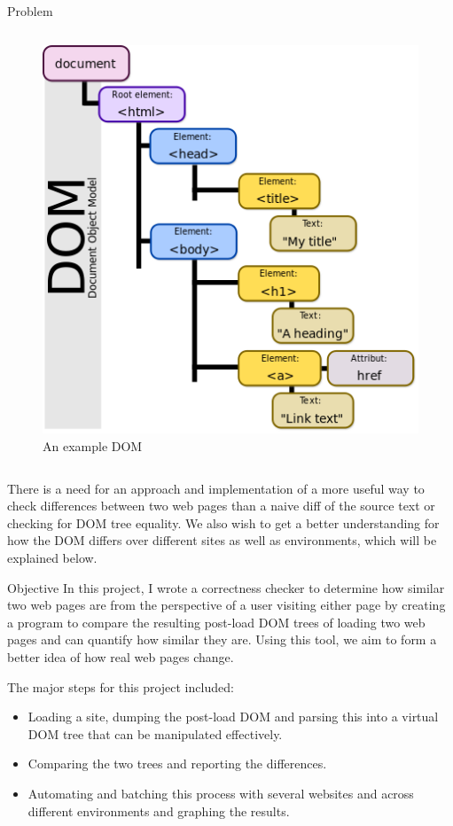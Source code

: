 \documentclass[final]{beamer}
\newlength{\halfcolwid}
\newlength{\onecolwid}
\begin{document}
\begin{frame}[t]
\begin{columns}[t]
\begin{column}{\onecolwid}
\begin{alertblock}{Problem}
\begin{columns}
\begin{column}{\halfcolwid} %
\begin{figure}
\includegraphics[width=0.6\linewidth]{dom.png}
\caption{An example DOM}
\end{figure}
\end{column}
\end{columns}
There is a need for an approach and implementation of a more useful way to check differences between two web pages than a naive diff of the source text or checking for DOM tree equality. We also wish to get a better understanding for how the DOM differs over different sites as well as environments, which will be explained below.
\end{alertblock}


\begin{block}{Objective}
In this project, I wrote a correctness checker to determine how similar two web pages are from the perspective of a user visiting either page by creating a program to compare the resulting post-load DOM trees of loading two web pages and can quantify how similar they are. Using this tool, we aim to form a better idea of how real web pages change. 

The major steps for this project included:
\begin{itemize}
    \item Loading a site, dumping the post-load DOM and parsing this into a virtual DOM tree that can be manipulated effectively. 
    \item Comparing the two trees and reporting the differences.
    \item Automating and batching this process with several websites and across different environments and graphing the results.
\end{itemize}
\end{block}


\end{column}
\end{columns}
\end{frame}
\end{document}
